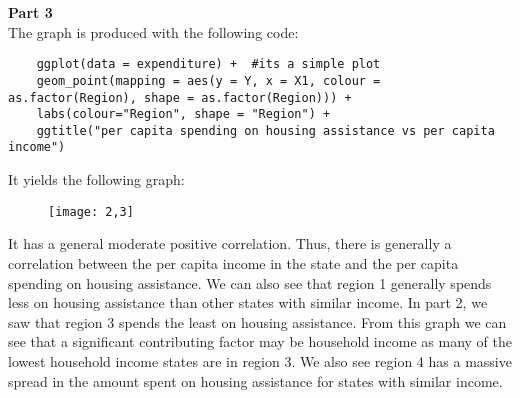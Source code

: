\documentclass{article}
\begin{document}
\noindent\textbf{\large Part 3\\} 
The graph is produced with the following code:
\begin{verbatim}
	ggplot(data = expenditure) +  #its a simple plot
	geom_point(mapping = aes(y = Y, x = X1, colour = as.factor(Region), shape = as.factor(Region))) + 
	labs(colour="Region", shape = "Region") +
	ggtitle("per capita spending on housing assistance vs per capita income")
\end{verbatim}
It yields the following graph:\\














































\begin{figure}[h]
	\centering
	\texttt{[image: 2,3]}
\end{figure}
It has a general moderate positive correlation. Thus, there is generally a correlation between the per capita income in the state and the per capita spending on housing assistance. We can also see that region 1 generally spends less on  housing assistance than other states with similar income. In part 2, we saw that region 3 spends the least on housing assistance. From this graph we can see that a significant contributing factor may be household income as many of the lowest household income states are in region 3. We also see region 4 has a massive spread in the amount spent on housing assistance for states with similar income.
\end{document}
